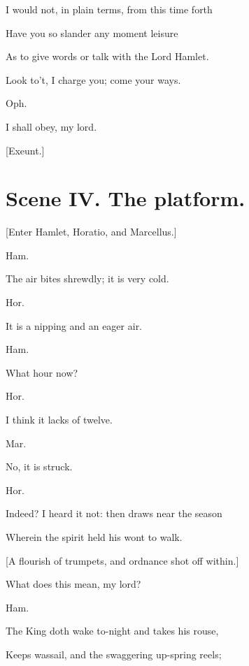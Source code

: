 \documentclass[12pt]{book}
\begin{document}
I would not, in plain terms, from this time forth

Have you so slander any moment leisure

As to give words or talk with the Lord Hamlet.

Look to't, I charge you; come your ways.



Oph.

I shall obey, my lord.



[Exeunt.]







\section*{Scene IV. The platform.}



[Enter Hamlet, Horatio, and Marcellus.]



Ham.

The air bites shrewdly; it is very cold.



Hor.

It is a nipping and an eager air.



Ham.

What hour now?



Hor.

I think it lacks of twelve.



Mar.

No, it is struck.



Hor.

Indeed? I heard it not: then draws near the season

Wherein the spirit held his wont to walk.



[A flourish of trumpets, and ordnance shot off within.]



What does this mean, my lord?



Ham.

The King doth wake to-night and takes his rouse,

Keeps wassail, and the swaggering up-spring reels;
\end{document}
